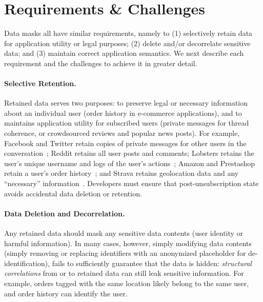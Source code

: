 \section{Requirements \& Challenges}

Data masks all have similar requirements, namely to (1) selectively retain data for application
utility or legal purposes; (2) delete and/or decorrelate sensitive data; and (3) maintain correct application semantics. We next describe each
requirement and the challenges to achieve it in greater detail.

%

\paragraph{Selective Retention.}
Retained data serves two purposes: to preserve legal or necessary information about an individual
user (\eg order history in e-commerce applications), and to maintains application utility for
subscribed users (\eg private messages for thread coherence, or crowdsourced reviews and popular
news posts).  For example, Facebook and Twitter retain copies of private messages for other users in
the conversation~\cite{facebook:privacy, twitter:privacy}; Reddit retains all user posts and comments;
Lobsters retains the user's unique username and logs of the user's actions~\cite{reddit:privacy};
Amazon and Prestashop retain a user's order history~\cite{amazon:privacy, prestashop:privacy}; and
Strava retains geolocation data and any ``necessary'' information~\cite{strava:privacy}. 
Developers must ensure that post-unsubscription state avoids accidental data deletion or retention.

\paragraph{Data Deletion and Decorrelation.}
Any retained data should mask any sensitive data contents (\eg user identity or harmful information). In many cases, however, simply modifying data contents (\eg simply removing or replacing
identifiers with an anonymized placeholder for de-identification), fails to sufficiently guarantee
that the data is hidden: \emph{structural correlations} from or to retained data can still leak sensitive
information. For example, orders tagged with the same location likely belong to the same user, and
order history can identify the user. 

